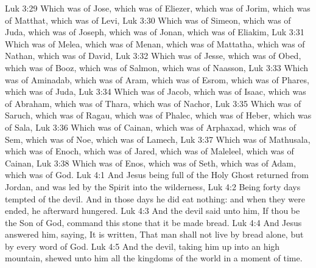 \vs Luk 3:29 Which was  of Jose, which was  of Eliezer, which was  of Jorim, which was  of Matthat, which was  of Levi,
\vs Luk 3:30 Which was  of Simeon, which was  of Juda, which was  of Joseph, which was  of Jonan, which was  of Eliakim,
\vs Luk 3:31 Which was  of Melea, which was  of Menan, which was  of Mattatha, which was  of Nathan, which was  of David,
\vs Luk 3:32 Which was  of Jesse, which was  of Obed, which was  of Booz, which was  of Salmon, which was  of Naasson,
\vs Luk 3:33 Which was  of Aminadab, which was  of Aram, which was  of Esrom, which was  of Phares, which was  of Juda,
\vs Luk 3:34 Which was  of Jacob, which was  of Isaac, which was  of Abraham, which was  of Thara, which was  of Nachor,
\vs Luk 3:35 Which was  of Saruch, which was  of Ragau, which was  of Phalec, which was  of Heber, which was  of Sala,
\vs Luk 3:36 Which was  of Cainan, which was  of Arphaxad, which was  of Sem, which was  of Noe, which was  of Lamech,
\vs Luk 3:37 Which was  of Mathusala, which was  of Enoch, which was  of Jared, which was  of Maleleel, which was  of Cainan,
\vs Luk 3:38 Which was  of Enos, which was  of Seth, which was  of Adam, which was  of God.
\vs Luk 4:1 And Jesus being full of the Holy Ghost returned from Jordan, and was led by the Spirit into the wilderness,
\vs Luk 4:2 Being forty days tempted of the devil. And in those days he did eat nothing: and when they were ended, he afterward hungered.
\vs Luk 4:3 And the devil said unto him, If thou be the Son of God, command this stone that it be made bread.
\vs Luk 4:4 And Jesus answered him, saying, It is written, That man shall not live by bread alone, but by every word of God.
\vs Luk 4:5 And the devil, taking him up into an high mountain, shewed unto him all the kingdoms of the world in a moment of time.
